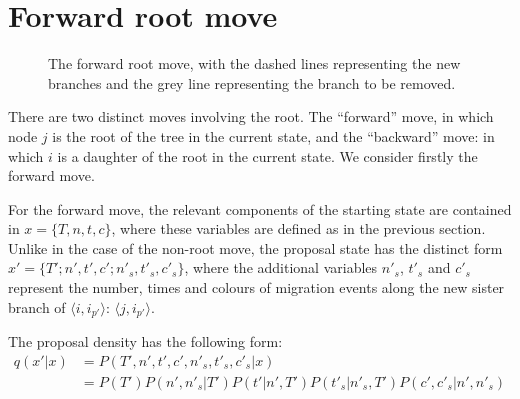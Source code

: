 \documentclass[a4paper,11pt]{article}
\begin{document}
\section{Forward root move}

\begin{figure}
\begin{center}
\end{center}
\caption{The forward root move, with the dashed lines representing
the new branches and the grey line representing the branch to be removed.}
\end{figure}

There are two distinct moves involving the root. The ``forward'' move,
in which node $j$ is the root of the tree in the current state, and
the ``backward'' move: in which $i$ is a daughter of the root in the
current state.  We consider firstly the forward move.

For the forward move, the relevant components of the starting state
are contained in $x=\{T,n,t,c\}$, where these variables are defined as
in the previous section.  Unlike in the case of the non-root move, the
proposal state has the distinct form
$x'=\{T';n',t',c';n'_s,t'_s,c'_s\}$, where the additional variables
$n'_s$, $t'_s$ and $c'_s$  represent the number, times and colours
of migration events along the new sister branch of $\langle
i,i_{p'}\rangle$: $\langle j,i_{p'}\rangle$.

The proposal density has the following form:
\begin{align}
  q(x'|x)&=P(T',n',t',c',n'_s,t'_s,c'_s|x)\\
&=P(T')P(n',n'_s|T')P(t'|n',T')P(t'_s|n'_s,T')P(c',c'_s|n',n'_s)\nonumber
\end{align}
\end{document}
